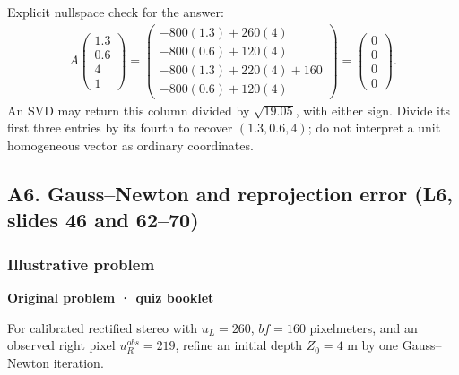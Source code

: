 \documentclass[letterpaper,11pt,english,openany,oneside]{jupyterBook}
\begin{document}
\sphinxAtStartPar
Explicit nullspace check for the answer:
{\color{QuizMathBlue} \begin{equation*}
\begin{split}
A\begin{pmatrix}1.3\\0.6\\4\\1\end{pmatrix}
=\begin{pmatrix}-800(1.3)+260(4)\\-800(0.6)+120(4)\\-800(1.3)+220(4)+160\\-800(0.6)+120(4)\end{pmatrix}
=\begin{pmatrix}0\\0\\0\\0\end{pmatrix}.
\end{split}
\end{equation*}}
\sphinxAtStartPar
An SVD may return this column divided by {\color{QuizMathBlue} \(\sqrt{19.05}\)}, with either sign. Divide its first three entries by its fourth to recover {\color{QuizMathBlue} \((1.3,0.6,4)\)}; do not interpret a unit homogeneous vector as ordinary coordinates.

\par


\subsection{A6. Gauss–Newton and reprojection error (L6, slides 46 and 62–70)}
\label{\detokenize{lectures/lecture06/quiz-workbook:a6-gaussnewton-and-reprojection-error-l6-slides-46-and-6270}}\label{\detokenize{lectures/lecture06/quiz-workbook:quiz-source-a6}}
\sphinxAtStartPar
{}


\subsubsection{Illustrative problem}
\label{\detokenize{lectures/lecture06/quiz-workbook:quiz-a6-q1}}\label{\detokenize{lectures/lecture06/quiz-workbook:id2}}
\par\medskip\textbf{Original problem · quiz booklet}\par\smallskip

\sphinxAtStartPar
For calibrated rectified stereo with \(u_L=260\), \(bf=160\) pixel\sphinxhyphen{}meters, and an observed right pixel \(u_R^{obs}=219\), refine an initial depth \(Z_0=4\) m by one Gauss–Newton iteration.
\end{document}
